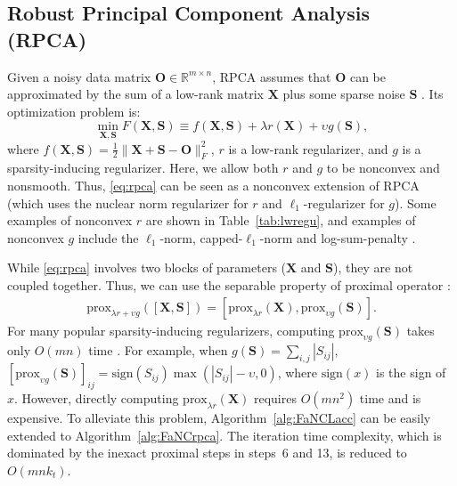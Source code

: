 \documentclass[10pt,journal,compsoc]{IEEEtran}
\def \R{\mathbb R}
\newcommand{\X}{\mathbf{X}}
\newcommand{\NM}[2]{\| #1 \|_{#2} }
\newcommand{\Prox}[2]{\text{prox}_{#1}(#2)}
\begin{document}

\subsection{Robust Principal Component Analysis (RPCA)}
\label{sec:rpca}

Given a noisy data matrix $\mathbf{O} \in \R^{m \times n}$, RPCA assumes that $\mathbf{O}$ can be approximated by the sum of a
low-rank matrix $\X$
plus some sparse noise $\mathbf{S}$ \cite{candes2011robust}. 
Its optimization problem is:
\begin{equation} \label{eq:rpca}
\min_{\X, \mathbf{S}} F(\X, \mathbf{S}) \equiv f(\X, \mathbf{S}) + \lambda r(\X) + \upsilon g(\mathbf{S}),
\end{equation} 
where 
$f(\X, \mathbf{S}) = \frac{1}{2}\NM{\X + \mathbf{S} - \mathbf{O}}{F}^2$,
$r$ is a low-rank regularizer, and $g$ is a sparsity-inducing regularizer.
Here, we allow both $r$ and $g$ to be nonconvex and nonsmooth. Thus, \eqref{eq:rpca} can be seen as a nonconvex extension of RPCA (which uses
the nuclear norm regularizer 
for $r$ 
and 
$\ell_1$-regularizer
for $g$).
Some examples of nonconvex $r$ are shown in Table~\ref{tab:lwregu},
and examples of nonconvex $g$ include the
$\ell_1$-norm,
capped-$\ell_1$-norm \cite{zhang2010analysis} and log-sum-penalty \cite{candes2008enhancing}.



While \eqref{eq:rpca} involves two blocks of parameters ($\X$ and $\mathbf{S}$), they are
not coupled together.  Thus, we can use the separable property 
of proximal operator
\cite{parikh2014proximal}:
\begin{align}
\Prox{\lambda r + \upsilon g}{[ \X, \mathbf{S} ]}
= 
[ 
\Prox{\lambda r}{\X},
\Prox{\upsilon g}{\mathbf{S}}
].
\label{eq:sep}
\end{align}
For many popular sparsity-inducing regularizers, computing $\Prox{\upsilon g}{\mathbf{S}}$
takes only $O(m n)$ time 
\cite{gongZLHY2013}.  For example, when $g(\mathbf{S}) = \sum_{i,j} |S_{ij}|$, 
$[\Prox{\upsilon g}{\mathbf{S}}]_{ij} = \text{sign}(S_{ij}) \max( |S_{ij}| - \upsilon, 0 )$,
where $\text{sign}(x)$ is the sign of $x$. 
However,
directly computing $\Prox{\lambda r}{\X}$ requires $O(m n^2)$ time and is expensive.
To alleviate this problem,
Algorithm~\ref{alg:FaNCLacc}
can be easily extended
to Algorithm~\ref{alg:FaNCrpca}.
The iteration time complexity, which is dominated by the inexact proximal steps  in
steps~6 and 13, is reduced to $O( m n k_t) $.
\end{document}
